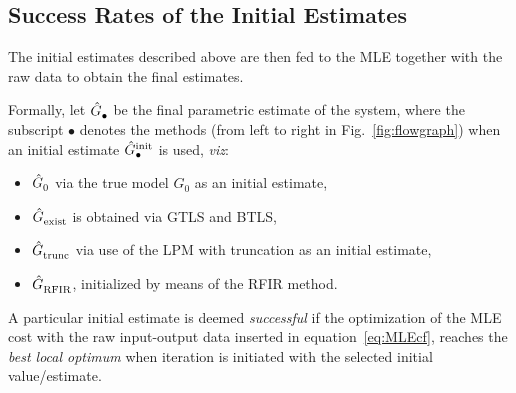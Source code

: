 

\subsection{Success Rates of the Initial Estimates}

The initial estimates described above are then fed to the MLE together with the raw data to obtain the final estimates.

Formally, let $\model{\bullet}$ be the final parametric estimate of the system, where the subscript $\bullet$ denotes the methods (from left to right in Fig.~\ref{fig:flowgraph}) when an initial estimate $\model[init]{\bullet}$ is used, \emph{viz}:
\begin{itemize}
\item 
$\model{0}$ via the true model $G_0$ as an initial estimate,
\item
$\model{exist}$ is obtained via GTLS and BTLS,
\item
$\model{trunc}$ via use of the LPM with truncation as an initial estimate,
\item
$\model{RFIR}$, initialized by means of the RFIR method. 
\end{itemize} 

A particular initial estimate is deemed \emph{successful} if the optimization of the MLE cost with the raw input-output data inserted in equation~\eqref{eq:MLEcf}, reaches the \emph{best local optimum} when iteration is initiated with the selected initial value/estimate.

